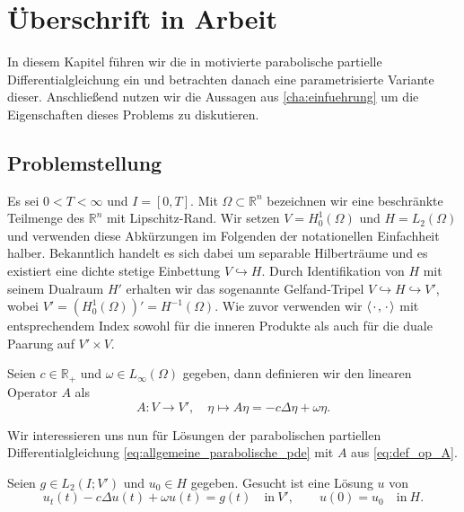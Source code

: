 
\chapter{Überschrift in Arbeit}

In diesem Kapitel führen wir die in \cite{Stasiak:2011ba} motivierte parabolische partielle Differentialgleichung ein und betrachten danach eine parametrisierte Variante dieser.
Anschließend nutzen wir die Aussagen aus \autoref{cha:einfuehrung} um die Eigenschaften dieses Problems zu diskutieren.

\section{Problemstellung} %
\label{sub:problemstellung}

Es sei $0 < T < \infty$ und $I = [0, T]$.
Mit $\Omega \subset \mathbb{R}^{n}$ bezeichnen wir eine beschränkte Teilmenge des $\mathbb{R}^{n}$ mit Lipschitz-Rand.
Wir setzen $V = H^{1}_{0}(\Omega)$ und $H = L_{2}(\Omega)$ und verwenden diese Abkürzungen im Folgenden der notationellen Einfachheit halber.
Bekanntlich handelt es sich dabei um separable Hilberträume und es existiert eine dichte stetige Einbettung $V \hookrightarrow H$.
Durch Identifikation von $H$ mit seinem Dualraum $H'$ erhalten wir das sogenannte Gelfand-Tripel $V \hookrightarrow H \hookrightarrow V'$, wobei $V' = (H^{1}_{0}(\Omega))' = H^{-1}(\Omega)$.
Wie zuvor verwenden wir $\left\langle{\mkern2mu\cdot\mkern2mu},{\mkern2mu\cdot\mkern2mu}\right\rangle$ mit entsprechendem Index sowohl für die inneren Produkte als auch für die duale Paarung auf $V' \times V$.

Seien $c \in \mathbb{R}_{+}$ und $\omega \in L_{\infty}(\Omega)$ gegeben, dann definieren wir den linearen Operator $A$ als
\begin{equation}
    \label{eq:def_op_A}
    A \colon V \to V', \quad \eta \mapsto A \eta = - c \Delta \eta + \omega \eta.
\end{equation}

Wir interessieren uns nun für Lösungen der parabolischen partiellen Differentialgleichung \eqref{eq:allgemeine_parabolische_pde} mit $A$ aus \eqref{eq:def_op_A}.
\begin{Problem}
Seien $g \in L_{2}(I; V')$ und $u_{0} \in H$ gegeben.
Gesucht ist eine Lösung $u$ von
\begin{equation}
    \label{eq:parabolische_pde}
    u_{t}(t) - c \Delta u(t) + \omega u(t) = g(t) \quad \text{in}~V',
    \qquad
    u(0) = u_{0} \quad \text{in}~H.
\end{equation}
\end{Problem}

